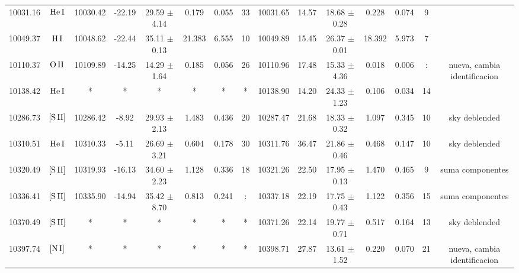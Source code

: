 \documentclass{article}
\begin{document}
\begin{table*}
\begin{adjustbox}{width=\textwidth}
\begin{tabular}{ccccccccccccccc}
10031.16 & $\mbox{He}\thinspace \mbox{I}$ & 10030.42 & -22.19 & 29.59 $\pm$ 4.14 & 0.179 & 0.055 & 33 & 10031.65 & 14.57 & 18.68 $\pm$ 0.28 & 0.228 & 0.074 & 9 &  \\
10049.37 & $\mbox{H}\thinspace \mbox{I}$ & 10048.62 & -22.44 & 35.11 $\pm$ 0.13 & 21.383 & 6.555 & 10 & 10049.89 & 15.45 & 26.37 $\pm$ 0.01 & 18.392 & 5.973 & 7 &  \\
10110.37 & $\mbox{O}\thinspace \mbox{II}$ & 10109.89 & -14.25 & 14.29 $\pm$ 1.64 & 0.185 & 0.056 & 26 & 10110.96 & 17.48 & 15.33 $\pm$ 4.36 & 0.018 & 0.006 & : &  nueva, cambia identificacion \\
10138.42 & $\mbox{He}\thinspace \mbox{I}$ & * & * & * & * & * & * & 10138.90 & 14.20 & 24.33 $\pm$ 1.23 & 0.106 & 0.034 & 14 &  \\
10286.73 & $\mbox{[S}\thinspace \mbox{II]}$ & 10286.42 & -8.92 & 29.93 $\pm$ 2.13 & 1.483 & 0.436 & 20 & 10287.47 & 21.68 & 18.33 $\pm$ 0.32 & 1.097 & 0.345 & 10 &  sky deblended \\
10310.51 & $\mbox{He}\thinspace \mbox{I}$ & 10310.33 & -5.11 & 26.69 $\pm$ 3.21 & 0.604 & 0.178 & 30 & 10311.76 & 36.47 & 21.86 $\pm$ 0.46 & 0.468 & 0.147 & 10 &  sky deblended \\
10320.49 & $\mbox{[S}\thinspace \mbox{II]}$ & 10319.93 & -16.13 & 34.60 $\pm$ 2.23 & 1.128 & 0.336 & 18 & 10321.26 & 22.50 & 17.95 $\pm$ 0.13 & 1.470 & 0.465 & 9 &  suma componentes \\
10336.41 & $\mbox{[S}\thinspace \mbox{II]}$ & 10335.90 & -14.94 & 35.42 $\pm$ 8.70 & 0.813 & 0.241 & : & 10337.18 & 22.19 & 17.75 $\pm$ 0.43 & 1.122 & 0.356 & 15 &  suma componentes \\
10370.49 & $\mbox{[S}\thinspace \mbox{II]}$ & * & * & * & * & * & * & 10371.26 & 22.14 & 19.77 $\pm$ 0.71 & 0.517 & 0.164 & 13 &  sky deblended \\
10397.74 & $\mbox{[N}\thinspace \mbox{I]}$ & * & * & * & * & * & * & 10398.71 & 27.87 & 13.61 $\pm$ 1.52 & 0.220 & 0.070 & 21 &  nueva, cambia identificacion \\
\hline
\end{tabular}
\end{adjustbox}
\end{table*}
\end{document}
